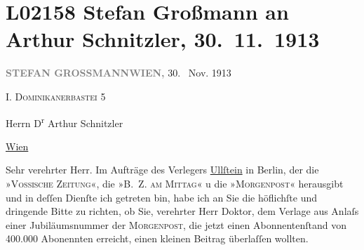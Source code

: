 

\section[Stefan Großmann an Arthur Schnitzler, 30. 11. 1913]{L02158 Stefan Großmann an Arthur Schnitzler, 30. 11. 1913}
\nopagebreak{}
\rehead{ }\normalsize\beginnumbering{}
\toendnotes[C]{\smallbreak\pagebreak[2]}
\pstart
           {\pb}\textcolor{gray}{\textbf{STEFAN GROSSMANN}}\hfill \textcolor{gray}{\textbf{WIEN,}}{ }30.  Nov. 1913\pend
           
\pstart
           \raggedleft{}I. \textsc{Dominikanerbastei}
                     5\pend
           
\pstart
           Herrn D\textsuperscript{r} Arthur Schnitzler\pend
           
\pstart
           \raggedleft{}\uline{Wien}\pend
           
\pstart{}Sehr verehrter Herr.\pend\vspace{0.5em}
\pstart
           Im Aufträge des Verlegers \uline{Ullſtein} in Berlin, der die »\textsc{Vossische Zeitung}«, die »\textsc{B. Z. am Mittag}« u die »\textsc{Morgenpost}« herausgibt und in deſſen Dienſte ich getreten bin, habe ich an Sie die
               höflichſte und dringende Bitte zu richten, ob Sie, verehrter Herr Doktor, dem Verlage
               aus Anlaſs einer Jubiläumsnummer der \textsc{Morgenpost}, die jetzt einen Abonnentenſtand von 400.000 Abonennten erreicht, einen kleinen
               Beitrag überlaſſen wollten.\pend
           
